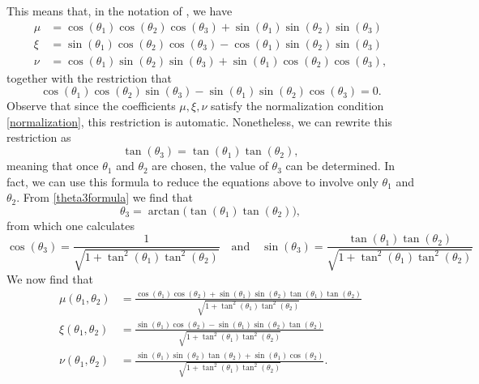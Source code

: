 \documentclass[reqno]{amsart}
\numberwithin{lemma}{section}
\numberwithin{proposition}{section}
\begin{document}
This means that, in the notation of \cite{REZAKHANI2005278}, we have
\begin{align*}
	\mu  &= \cos(\theta_{1}) \cos(\theta_{2}) \cos(\theta_{3}) + \sin(\theta_{1}) \sin(\theta_{2}) \sin(\theta_{3})\\
	\xi &= \sin(\theta_{1}) \cos(\theta_{2}) \cos(\theta_{3}) - \cos(\theta_{1}) \sin(\theta_{2}) \sin(\theta_{3})\\
	\nu &= \cos(\theta_{1}) \sin(\theta_{2}) \sin(\theta_{3}) + \sin(\theta_{1}) \cos(\theta_{2}) \cos(\theta_{3}),
\end{align*}
together with the restriction that
\begin{equation*}
	\cos(\theta_{1}) \cos(\theta_{2}) \sin(\theta_{3}) - \sin(\theta_{1}) \sin(\theta_{2}) \cos(\theta_{3}) = 0.
\end{equation*}
Observe that since the coefficients $\mu, \xi, \nu$ satisfy the normalization condition \eqref{normalization}, this restriction is automatic. Nonetheless, we can rewrite this restriction as
\begin{equation}
	\label{theta3formula}
	\tan(\theta_{3}) = \tan(\theta_{1}) \tan(\theta_{2}),
\end{equation}
meaning that once $\theta_{1}$ and $\theta_{2}$ are chosen, the value of $\theta_{3}$ can be determined. In fact, we can use this formula to reduce the equations above to involve only $\theta_{1}$ and $\theta_{2}$. From \eqref{theta3formula} we find that
\begin{equation*}
	\theta_{3} = \arctan \Big ( \tan(\theta_{1}) \tan(\theta_{2}) \Big ),
\end{equation*}
from which one calculates
\begin{equation*}
	\cos(\theta_{3}) = \frac{1}{\sqrt{1 + \tan^{2}(\theta_{1}) \tan^{2}(\theta_{2})}} \quad \text{and} \quad \sin(\theta_{3}) = \frac{\tan(\theta_{1}) \tan(\theta_{2})}{\sqrt{1 + \tan^{2}(\theta_{1}) \tan^{2}(\theta_{2})}}
\end{equation*}
We now find that
\begin{align*}
	\mu(\theta_{1}, \theta_{2}) &= \frac{\cos(\theta_{1}) \cos(\theta_{2}) + \sin(\theta_{1}) \sin(\theta_{2}) \tan(\theta_{1}) \tan(\theta_{2})}{\sqrt{1 + \tan^{2}(\theta_{1}) \tan^{2}(\theta_{2})}}\\
	\xi(\theta_{1}, \theta_{2}) &= \frac{\sin(\theta_{1}) \cos(\theta_{2}) - \sin(\theta_{1}) \sin(\theta_{2}) \tan(\theta_{2})}{\sqrt{1 + \tan^{2}(\theta_{1}) \tan^{2}(\theta_{2})}}\\
	\nu(\theta_{1}, \theta_{2}) &= \frac{\sin(\theta_{1}) \sin(\theta_{2}) \tan(\theta_{2}) + \sin(\theta_{1}) \cos(\theta_{2})}{\sqrt{1 + \tan^{2}(\theta_{1}) \tan^{2}(\theta_{2})}}.
\end{align*}
\end{document}
